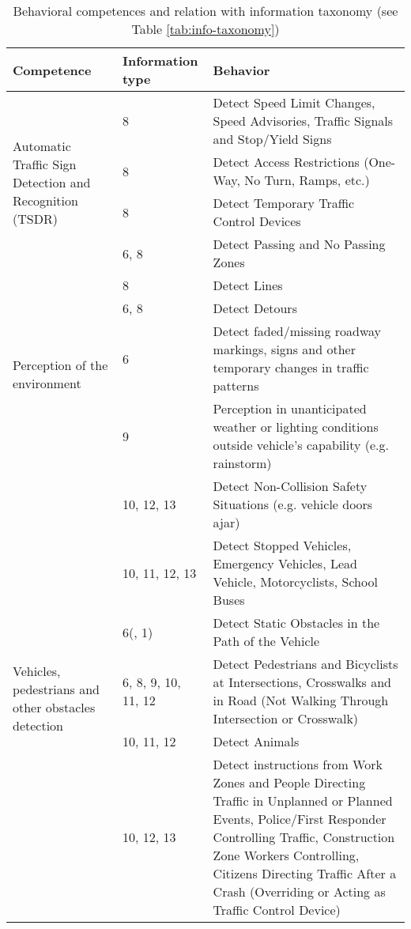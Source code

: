 \begin{table*} %
    \caption{Behavioral competences and relation with information taxonomy 
        (see Table \ref{tab:info-taxonomy})}
    \label{tab:behavioral-competences}
    \begin{tabular*}{\textwidth}{m{4cm} l p{11cm}}%
        \hline %
        \textbf{Competence}	& \textbf{Information type} & \textbf{Behavior}	
        \\
        \hline %
        \multirow{4}{4cm}{Automatic Traffic Sign Detection
                         and Recognition (TSDR)}
         & 8    & Detect Speed Limit Changes, Speed Advisories, Traffic Signals 
         and Stop/Yield Signs \\
         & 8    & Detect Access Restrictions (One-Way, No Turn, Ramps, etc.) \\
         & 8    & Detect Temporary Traffic Control Devices \\
         & 6, 8 & Detect Passing and No Passing Zones  \\
         \hline %
         \multirow{4}{*}{Perception of the environment}
         & 8 & Detect Lines \\
         & 6, 8 & Detect Detours  \\
         & 6 & Detect faded/missing roadway markings, signs and other 
         temporary changes in traffic patterns \\
         & 9 & Perception in unanticipated weather or lighting conditions 
         outside 
         vehicle’s capability (e.g. rainstorm) \\
         \hline %
         \multirow{6}{4cm}{Vehicles, pedestrians and other obstacles 
         detection}
         & 10, 12, 13 & Detect Non-Collision Safety Situations (e.g. vehicle 
         doors ajar) \\
         & 10, 11, 12, 13 & Detect Stopped Vehicles, Emergency Vehicles, Lead 
         Vehicle, Motorcyclists, School Buses \\
         & 6(, 1)  & Detect Static Obstacles in the Path of the Vehicle \\
         & 6, 8, 9, 10, 11, 12 & Detect Pedestrians and Bicyclists at 
         Intersections, Crosswalks and in Road (Not Walking Through 
         Intersection or Crosswalk) \\
         & 10, 11, 12 & Detect Animals \\
         & 10, 12, 13 & Detect instructions from Work Zones and People 
         Directing Traffic in Unplanned or Planned Events, Police/First 
         Responder Controlling Traffic, Construction Zone Workers Controlling, 
         Citizens Directing Traffic After a Crash (Overriding or Acting as 
         Traffic Control Device) \\

        \hline %
    \end{tabular*}
\end{table*}

